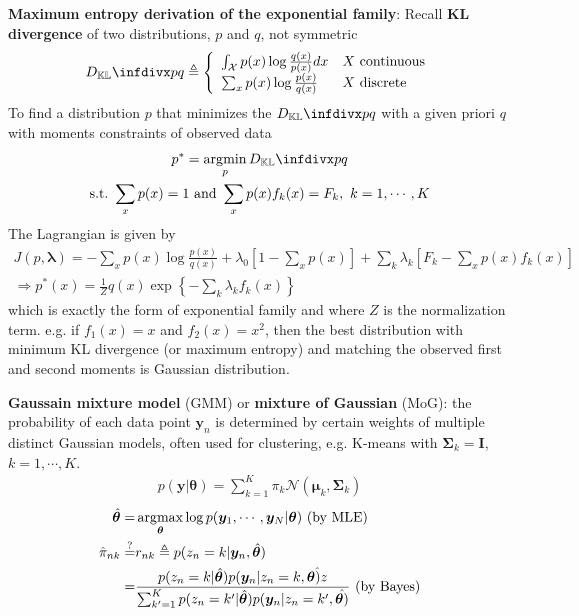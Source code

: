\textbf{Maximum entropy derivation of the exponential family}:
Recall \textbf{KL divergence} of two distributions, $p$ and $q$, not symmetric
\begin{gather}
    \infdiv{p}{q}
    \triangleq\left\{
    \begin{array}{ll}
        \int_\mathcal{X}{p(x)\log\frac{q(x)}{p(x)}}dx & X~\text{continuous} \\
        \sum_x{p(x)\log\frac{p(x)}{q(x)}} & X~\text{discrete}
    \end{array}\right.
\end{gather}
To find a distribution $p$ that minimizes the $\infdiv{p}{q}$ with a given priori $q$
with moments constraints of observed data
\begin{gather}
    p^*=\argmin_p\infdiv{p}{q}\\
    \mathrm{s.t.}~\sum_x{p(x)}=1
    ~\text{and}~
    \sum_x{p(x)f_k(x)}=F_k,~k=1,\cdots,K
\end{gather}
The Lagrangian is given by
{\small\begin{gather}
    J(p,\bm{\lambda})
    =- \sum_x{p(x)\log\frac{p(x)}{q(x)}}
    + \lambda_0\left[1-\sum_x{p(x)}\right]
    + \sum_k{\lambda_k\left[ F_k-\sum_x{p(x)f_k(x)} \right]}\\
\Rightarrow
    p^*(x)=\frac{1}{Z}q(x)\exp\left\{-\sum_k{\lambda_kf_k(x)}\right\}
\end{gather}}
which is exactly the form of exponential family and where $Z$ is the normalization term.
e.g. if $f_1(x)=x$ and $f_2(x)=x^2$, then the best distribution with minimum KL divergence 
(or maximum entropy) and matching the observed first and second moments is Gaussian distribution.

\textbf{Gaussain mixture model} (GMM) or \textbf{mixture of Gaussian} (MoG): 
the probability of each data point $\bm{y}_n$ is determined 
by certain weights of multiple distinct Gaussian models,
often used for clustering, e.g. K-means with $\bm{\Sigma}_k=\bm{I}$, $k=1,\cdots,K$.
\begin{gather}
    p(\bm{y}|\bm{\theta})=\sum_{k=1}^K{\pi_k\mathcal{N}(\bm{\mu}_k,\bm{\Sigma}_k)}
\end{gather}
\begin{align}
    \hat{\bm{\theta}}
    =& \operatorname*{\arg\!max}_{\bm{\theta}}\log{p(\bm{y}_1,\cdots,\bm{y}_N|\bm{\theta})}~\text{(by MLE)}\\
    \hat{\pi}_{nk}
    \overset{?}{=}& r_{nk}\triangleq p(z_n=k|\bm{y}_n,\hat{\bm{\theta}}) \label{eq:mogpir}\\
    =& \frac{p(z_n=k|\hat{\bm{\theta}})p(\bm{y}_n|z_n=k,\hat{\bm{\theta})z}}
    {\sum_{k'=1}^K{p(z_n=k'|\hat{\bm{\theta}})p(\bm{y}_n|z_n=k',\hat{\bm{\theta})}}}~\text{(by Bayes)}
\end{align}

